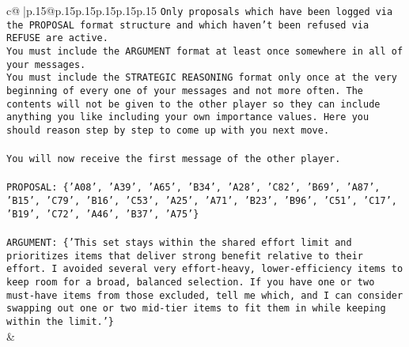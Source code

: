 \documentclass{article}
\begin{document}
{\begin{supertabular}{c@{$\;$}|p{.15\linewidth}@{}p{.15\linewidth}p{.15\linewidth}p{.15\linewidth}p{.15\linewidth}p{.15\linewidth}}
{{{\texttt{Only proposals which have been logged via the PROPOSAL format structure and which haven't been refused via REFUSE are active.} \\
\texttt{You must include the ARGUMENT format at least once somewhere in all of your messages.} \\
\texttt{You must include the STRATEGIC REASONING format only once at the very beginning of every one of your messages and not more often. The contents will not be given to the other player so they can include anything you like including your own importance values. Here you should reason step by step to come up with you next move.} \\
\\ 
\texttt{You will now receive the first message of the other player.} \\
\\ 
\texttt{PROPOSAL: \{'A08', 'A39', 'A65', 'B34', 'A28', 'C82', 'B69', 'A87', 'B15', 'C79', 'B16', 'C53', 'A25', 'A71', 'B23', 'B96', 'C51', 'C17', 'B19', 'C72', 'A46', 'B37', 'A75'\}} \\
\\ 
\texttt{ARGUMENT: \{'This set stays within the shared effort limit and prioritizes items that deliver strong benefit relative to their effort. I avoided several very effort{-}heavy, lower{-}efficiency items to keep room for a broad, balanced selection. If you have one or two must{-}have items from those excluded, tell me which, and I can consider swapping out one or two mid{-}tier items to fit them in while keeping within the limit.'\}} \\
            }
        }
    }
    & \\ \\


\end{supertabular}}
\end{document}
